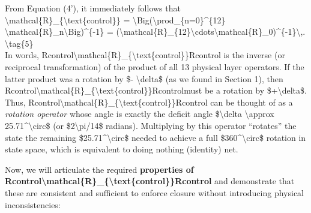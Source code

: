 \documentclass[]{article}
\begin{document}
{From Equation (4'), it immediately follows that\\
\textbackslash{}mathcal\{R\}\_\{\textbackslash{}text\{control\}\} =
\textbackslash{}Big(\textbackslash{}prod\_\{n=0\}\^{}\{12\}
\textbackslash{}mathcal\{R\}\_n\textbackslash{}Big)\^{}\{-1\} =
(\textbackslash{}mathcal\{R\}\_\{12\}\textbackslash{}cdots\textbackslash{}mathcal\{R\}\_0)\^{}\{-1\}\textbackslash{},.
\textbackslash{}tag\{5\}\\
In words,
Rcontrol\textbackslash{}mathcal\{R\}\_\{\textbackslash{}text\{control\}\}Rcontrol​
is the inverse (or reciprocal transformation) of the product of all 13
physical layer operators. If the latter product was a rotation by \$-
\textbackslash{}delta\$ (as we found in Section 1), then
Rcontrol\textbackslash{}mathcal\{R\}\_\{\textbackslash{}text\{control\}\}Rcontrol​
must be a rotation by \$+\textbackslash{}delta\$. Thus,
Rcontrol\textbackslash{}mathcal\{R\}\_\{\textbackslash{}text\{control\}\}Rcontrol​
can be thought of as a \emph{rotation operator} whose angle is exactly
the deficit angle \$\textbackslash{}delta \textbackslash{}approx
25.71\^{}\textbackslash{}circ\$ (or \$2\textbackslash{}pi/14\$ radians).
Multiplying by this operator ``rotates'' the state the remaining
\$25.71\^{}\textbackslash{}circ\$ needed to achieve a full
\$360\^{}\textbackslash{}circ\$ rotation in state space, which is
equivalent to doing nothing (identity) net.

Now, we will articulate the required \textbf{properties of
Rcontrol\textbackslash{}mathcal\{R\}\_\{\textbackslash{}text\{control\}\}Rcontrol​}
and demonstrate that these are consistent and sufficient to enforce
closure without introducing physical inconsistencies:

}
\end{document}
